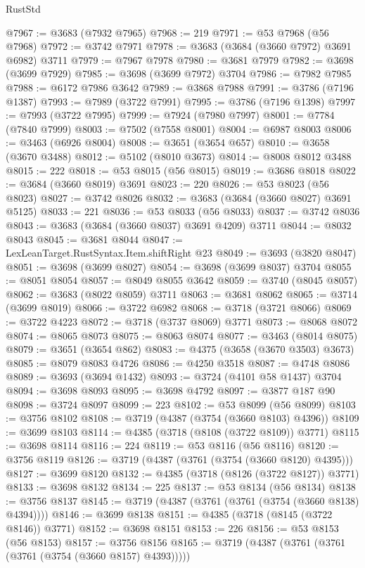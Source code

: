 \begin{lexlean}{RustStd}
\begin{coremodule}
@7967 := @3683 (@7932 @7965)
@7968 := 219
@7971 := @53 @7968 (@56 @7968)
@7972 := @3742 @7971
@7978 := @3683 (@3684 (@3660 @7972) @3691 @6982) @3711
@7979 := @7967 @7978
@7980 := @3681 @7979
@7982 := @3698 (@3699 @7929)
@7985 := @3698 (@3699 @7972) @3704
@7986 := @7982 @7985
@7988 := @6172 @7986 @3642
@7989 := @3868 @7988
@7991 := @3786 (@7196 @1387)
@7993 := @7989 (@3722 @7991)
@7995 := @3786 (@7196 @1398)
@7997 := @7993 (@3722 @7995)
@7999 := @7924 (@7980 @7997)
@8001 := @7784 (@7840 @7999)
@8003 := @7502 (@7558 @8001)
@8004 := @6987 @8003
@8006 := @3463 (@6926 @8004)
@8008 := @3651 (@3654 @657)
@8010 := @3658 (@3670 @3488)
@8012 := @5102 (@8010 @3673)
@8014 := @8008 @8012 @3488
@8015 := 222
@8018 := @53 @8015 (@56 @8015)
@8019 := @3686 @8018
@8022 := @3684 (@3660 @8019) @3691
@8023 := 220
@8026 := @53 @8023 (@56 @8023)
@8027 := @3742 @8026
@8032 := @3683 (@3684 (@3660 @8027) @3691 @5125)
@8033 := 221
@8036 := @53 @8033 (@56 @8033)
@8037 := @3742 @8036
@8043 := @3683 (@3684 (@3660 @8037) @3691 @4209) @3711
@8044 := @8032 @8043
@8045 := @3681 @8044
@8047 := LexLeanTarget.RustSyntax.Item.shiftRight @23
@8049 := @3693 (@3820 @8047)
@8051 := @3698 (@3699 @8027)
@8054 := @3698 (@3699 @8037) @3704
@8055 := @8051 @8054
@8057 := @8049 @8055 @3642
@8059 := @3740 (@8045 @8057)
@8062 := @3683 (@8022 @8059) @3711
@8063 := @3681 @8062
@8065 := @3714 (@3699 @8019)
@8066 := @3722 @6982
@8068 := @3718 (@3721 @8066)
@8069 := @3722 @4223
@8072 := @3718 (@3737 @8069) @3771
@8073 := @8068 @8072
@8074 := @8065 @8073
@8075 := @8063 @8074
@8077 := @3463 (@8014 @8075)
@8079 := @3651 (@3654 @862)
@8083 := @4375 (@3658 (@3670 @3503) @3673)
@8085 := @8079 @8083 @4726
@8086 := @4250 @3518
@8087 := @4748 @8086
@8089 := @3693 (@3694 @1432)
@8093 := @3724 (@4101 @58 @1437) @3704
@8094 := @3698 @8093
@8095 := @3698 @4792
@8097 := @3877 @187 @90
@8098 := @3724 @8097
@8099 := 223
@8102 := @53 @8099 (@56 @8099)
@8103 := @3756 @8102
@8108 := @3719 (@4387 (@3754 (@3660 @8103) @4396))
@8109 := @3699 @8103
@8114 := @4385 (@3718 (@8108 (@3722 @8109)) @3771)
@8115 := @3698 @8114
@8116 := 224
@8119 := @53 @8116 (@56 @8116)
@8120 := @3756 @8119
@8126 := @3719 (@4387 (@3761 (@3754 (@3660 @8120) @4395)))
@8127 := @3699 @8120
@8132 := @4385 (@3718 (@8126 (@3722 @8127)) @3771)
@8133 := @3698 @8132
@8134 := 225
@8137 := @53 @8134 (@56 @8134)
@8138 := @3756 @8137
@8145 := @3719 (@4387 (@3761 (@3761 (@3754 (@3660 @8138) @4394))))
@8146 := @3699 @8138
@8151 := @4385 (@3718 (@8145 (@3722 @8146)) @3771)
@8152 := @3698 @8151
@8153 := 226
@8156 := @53 @8153 (@56 @8153)
@8157 := @3756 @8156
@8165 := @3719 (@4387 (@3761 (@3761 (@3761 (@3754 (@3660 @8157) @4393)))))

\end{coremodule}
\end{lexlean}
